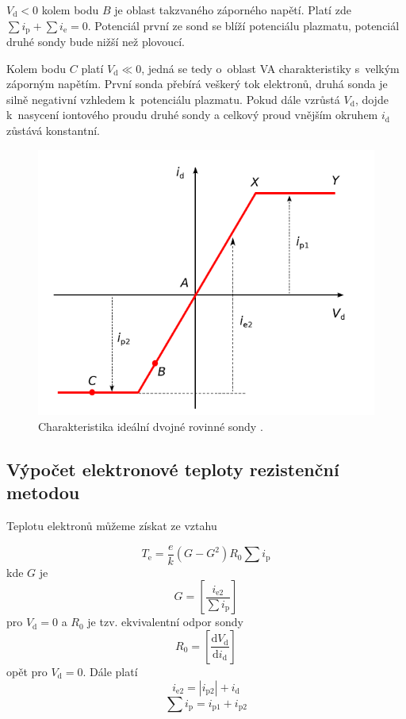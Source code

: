 \documentclass[a4paper,12pt]{article}
\begin{document}
$V_\text{{d}} < 0 $ kolem bodu $B$ je
oblast takzvaného záporného napětí. Platí zde 	
$\sum i_\text{{p}} + \sum i_\text{{e}} = 0$.
Potenciál první ze sond se blíží potenciálu plazmatu,
potenciál druhé sondy bude nižší než plovoucí.

Kolem bodu $C$ platí $V_\text{{d}} \ll 0 $, jedná se tedy
o~oblast VA charakteristiky s~velkým záporným napětím.
První sonda přebírá veškerý tok elektronů, druhá sonda
je silně negativní vzhledem k~potenciálu plazmatu.
Pokud dále vzrůstá $V_\text{{d}}$, dojde k~nasycení
iontového proudu druhé sondy a celkový proud vnějším
okruhem $i_\text{{d}}$ zůstává konstantní.

\begin{figure}[h]
	\centering
	\includegraphics[width=130mm]{charakteristikadvojna.png}
	\caption{Charakteristika ideální dvojné rovinné sondy \cite{navod}.}
	\label{charakteristikadvojna}
\end{figure}
\newpage

\subsection{Výpočet elektronové teploty rezistenční metodou}
Teplotu elektronů můžeme získat ze vztahu

\begin{equation}
	T_\text{{e}} = \frac{e}{k} (G-G^2) R_0 \sum i_\text{{p}}
	\label{T}
\end{equation}
kde $G$ je 
\begin{equation}
	G = \left[ \frac{i_\text{{e2}}}{\sum i_\text{{p}}}\right] 
	\label{G}
\end{equation}
pro $V_\text{{d}} = 0$ a $R_0$ je tzv. ekvivalentní odpor sondy
\begin{equation}
	R_0 = \left[ \frac{\text{d} V_\text{d}} {\text{d}i_\text{d}}
	\right] 
	\label{R}
\end{equation}
opět pro $V_\text{{d}} = 0$. Dále platí
\begin{equation}
	i_\text{{e2}} = |i_\text{{p2}}| + i_\text{{d}}
	\label{ie2}
\end{equation}
\begin{equation}
	\sum i_\text{{p}} = i_\text{{p1}} + i_\text{{p2}}
	\label{sumaip}
\end{equation}
\end{document}
